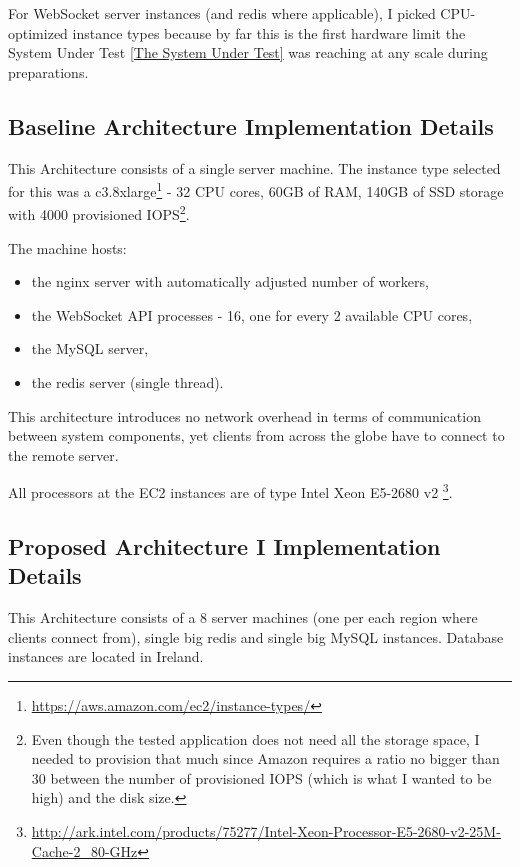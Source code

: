 \documentclass{uvamscse}
\begin{document}
For WebSocket server instances (and redis where applicable), I picked CPU-optimized instance types because by far this is the first hardware limit the System Under Test \ref{The System Under Test} was reaching at any scale during preparations.

\subsection{Baseline Architecture Implementation Details}\label{Baseline Architecture Implementation Details}

This Architecture consists of a single server machine. The instance type selected for this was a c3.8xlarge\footnote{\url{https://aws.amazon.com/ec2/instance-types/}} - 32 CPU cores, 60GB of RAM, 140GB of SSD storage with 4000 provisioned IOPS\footnote{Even though the tested application does not need all the storage space, I needed to provision that much since Amazon requires a ratio no bigger than 30 between the number of provisioned IOPS (which is what I wanted to be high) and the disk size.}.

The machine hosts:
\begin{itemize}
  \item the nginx server with automatically adjusted number of workers,
  \item the WebSocket API processes - 16, one for every 2 available CPU cores,
  \item the MySQL server,
  \item the redis server (single thread).
\end{itemize}

This architecture introduces no network overhead in terms of communication between system components, yet clients from across the globe have to connect to the remote server.

All processors at the EC2 instances are of type Intel Xeon E5-2680 v2 \footnote{\url{http://ark.intel.com/products/75277/Intel-Xeon-Processor-E5-2680-v2-25M-Cache-2_80-GHz}}.

\subsection{Proposed Architecture I Implementation Details}\label{Proposed Architecture I Implementation Details}

This Architecture consists of a 8 server machines (one per each region where clients connect from), single big redis and single big MySQL instances. Database instances are located in Ireland.
\end{document}
